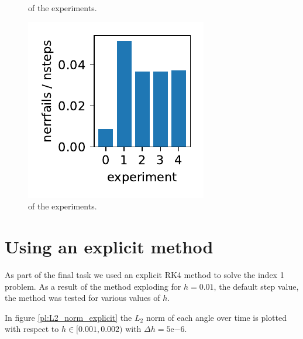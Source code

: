 \documentclass{report}
\begin{document}
\begin{figure}[h]
\begin{minipage}[t]{0.3\textwidth}
\caption{ of the experiments.}
\label{pl:njacs_nsteps_indx1}
\end{minipage}
\hfill
\begin{minipage}[t]{0.3\textwidth}
\centering
\includegraphics[width=\textwidth]{../Plots/Project2_main/Figure_712}
\caption{ of the experiments.}
\label{pl:nerrfails_nsteps_indx1}
\end{minipage}
\end{figure}

\section*{Using an explicit method}

As part of the final task we used an explicit RK4 method to solve the index 1 problem. As a result of the method exploding for $h=0.01$, the default step value, the method was tested for various values of $h$.

In figure  \ref{pl:L2_norm_explicit} the $L_2$ norm of each angle over time is plotted with respect to $h \in [0.001, 0.002)$ with $\Delta h = 5\mathrm{e}{-6}$.
\end{document}
